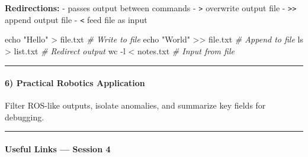 \documentclass[
  english,
  paper=a4,
  oneside  ,captions=tableheading
]{scrartcl}
\newenvironment{Shaded}{}{}
\newcommand{\AttributeTok}[1]{\textcolor[rgb]{0.49,0.56,0.16}{#1}}
\newcommand{\BuiltInTok}[1]{\textcolor[rgb]{0.00,0.50,0.00}{#1}}
\newcommand{\CommentTok}[1]{\textcolor[rgb]{0.38,0.63,0.69}{\textit{#1}}}
\newcommand{\FunctionTok}[1]{\textcolor[rgb]{0.02,0.16,0.49}{#1}}
\newcommand{\KeywordTok}[1]{\textcolor[rgb]{0.00,0.44,0.13}{\textbf{#1}}}
\newcommand{\NormalTok}[1]{#1}
\newcommand{\OperatorTok}[1]{\textcolor[rgb]{0.40,0.40,0.40}{#1}}
\newcommand{\StringTok}[1]{\textcolor[rgb]{0.25,0.44,0.63}{#1}}
\begin{document}
\textbf{Redirections:} - \texttt{\textbar{}} passes output between
commands - \texttt{\textgreater{}} overwrite output file -
\texttt{\textgreater{}\textgreater{}} append output file -
\texttt{\textless{}} feed file as input

\begin{Shaded}
\begin{Highlighting}[]
\BuiltInTok{echo} \StringTok{"Hello"} \OperatorTok{\textgreater{}}\NormalTok{ file.txt                     }\CommentTok{\# Write to file}
\BuiltInTok{echo} \StringTok{"World"} \OperatorTok{\textgreater{}\textgreater{}}\NormalTok{ file.txt                    }\CommentTok{\# Append to file}
\FunctionTok{ls} \OperatorTok{\textgreater{}}\NormalTok{ list.txt                               }\CommentTok{\# Redirect output}
\FunctionTok{wc} \AttributeTok{{-}l} \OperatorTok{\textless{}}\NormalTok{ notes.txt                           }\CommentTok{\# Input from file}
\end{Highlighting}
\end{Shaded}

\begin{center}\rule{0.5\linewidth}{0.5pt}\end{center}

\paragraph{6) Practical Robotics
Application}\label{practical-robotics-application}

Filter ROS-like outputs, isolate anomalies, and summarize key fields for
debugging.

\begin{Shaded}
\end{Shaded}

\begin{center}\rule{0.5\linewidth}{0.5pt}\end{center}

\paragraph{Useful Links --- Session 4}\label{useful-links-session-4}
\end{document}

